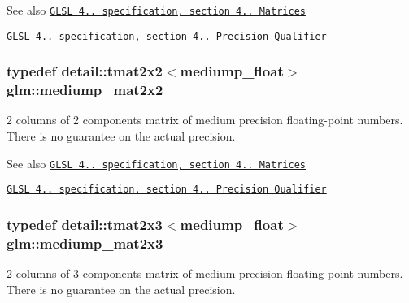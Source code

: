 \begin{DoxySeeAlso}{\-See also}
\href{http://www.opengl.org/registry/doc/GLSLangSpec.4.20.8.pdf}{\tt \-G\-L\-S\-L 4.. specification, section 4.. \-Matrices} 

\href{http://www.opengl.org/registry/doc/GLSLangSpec.4.20.8.pdf}{\tt \-G\-L\-S\-L 4.. specification, section 4.. \-Precision \-Qualifier} 
\end{DoxySeeAlso}
\hypertarget{group__core__precision_gaa78fd2384931c244700851141b8a47eb}{
\subsubsection[{mediump\-\_\-mat2x2}]{\setlength{\rightskip}{0pt plus 5cm}typedef detail\-::tmat2x2$<$mediump\-\_\-float$>$ {\bf glm\-::mediump\-\_\-mat2x2}}}\label{group__core__precision_gaa78fd2384931c244700851141b8a47eb}
2 columns of 2 components matrix of medium precision floating-\/point numbers. \-There is no guarantee on the actual precision.

\begin{DoxySeeAlso}{\-See also}
\href{http://www.opengl.org/registry/doc/GLSLangSpec.4.20.8.pdf}{\tt \-G\-L\-S\-L 4.. specification, section 4.. \-Matrices} 

\href{http://www.opengl.org/registry/doc/GLSLangSpec.4.20.8.pdf}{\tt \-G\-L\-S\-L 4.. specification, section 4.. \-Precision \-Qualifier} 
\end{DoxySeeAlso}
\hypertarget{group__core__precision_gac44c7deb23abed76330948e10d919bcc}{
\subsubsection[{mediump\-\_\-mat2x3}]{\setlength{\rightskip}{0pt plus 5cm}typedef detail\-::tmat2x3$<$mediump\-\_\-float$>$ {\bf glm\-::mediump\-\_\-mat2x3}}}\label{group__core__precision_gac44c7deb23abed76330948e10d919bcc}
2 columns of 3 components matrix of medium precision floating-\/point numbers. \-There is no guarantee on the actual precision.

